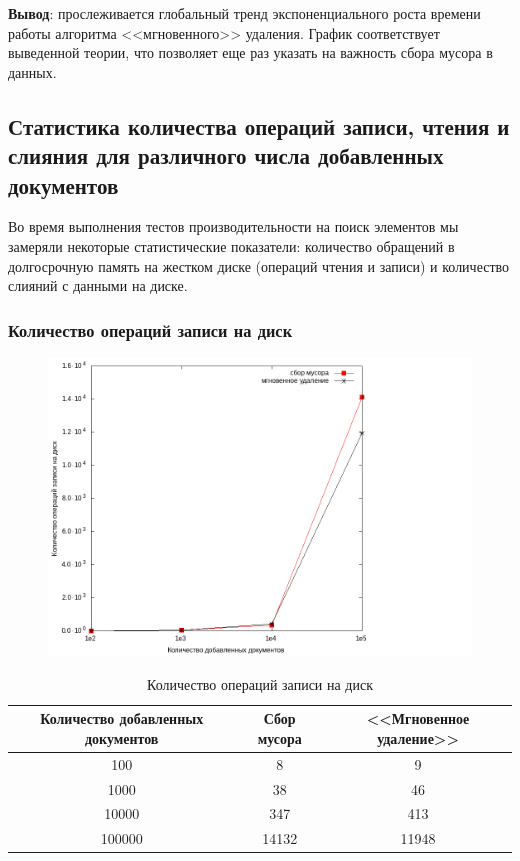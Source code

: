 \textbf{Вывод}: прослеживается глобальный тренд экспоненциального роста времени
работы алгоритма <<мгновенного>> удаления. График соответствует выведенной теории,
что позволяет еще раз указать на важность сбора мусора в данных.

\newpage
\subsection{Статистика количества операций записи, чтения и слияния для различного числа добавленных документов}

Во время выполнения тестов производительности на поиск элементов мы замеряли
некоторые статистические показатели: количество обращений в долгосрочную память
на жестком диске (операций чтения и записи) и количество слияний с данными на
диске.
\subsubsection{Количество операций записи на диск}

\begin{figure}[H]
\includegraphics[width=\linewidth]{fig/writecalls.png}
\end{figure}

\begin{table}[H]
      \caption{Количество операций записи на диск}
      \centering
      \small
      \singlespacing
      \begin{tabular}{|c|c|c|}
            \hline
            Количество добавленных документов   & Сбор мусора                 & <<Мгновенное удаление>>     \\ \hline \hline
            100                                 & 8                           & 9                           \\ \hline
            1000                                & 38                          & 46                          \\ \hline
            10000                               & 347                         & 413                         \\ \hline
            100000                              & 14132                       & 11948                       \\ \hline
\end{tabular}
\end{table}

